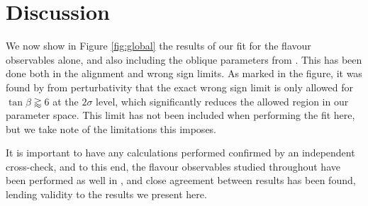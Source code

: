 \documentclass[a4paper,12pt]{article}
\begin{document}
\section{Discussion}
\label{sec:discuss}
We now show in Figure \ref{fig:global} the results of our fit for the flavour observables alone, and also including the oblique parameters from \cite{james}.
This has been done both in the alignment and wrong sign limits. 
As marked in the figure, it was found by \cite{oliver} from perturbativity that the exact wrong sign limit is only allowed for $\tan\beta\gtrapprox6$ at the $2\sigma$ level, which significantly reduces the allowed region in our parameter space. 
This limit has not been included when performing the fit here, but we take note of the limitations this imposes.

It is important to have any calculations performed confirmed by an independent cross-check, and to this end, the flavour observables studied throughout have been performed as well in \cite{tom}, and close agreement between results has been found, lending validity to the results we present here. 
\end{document}
